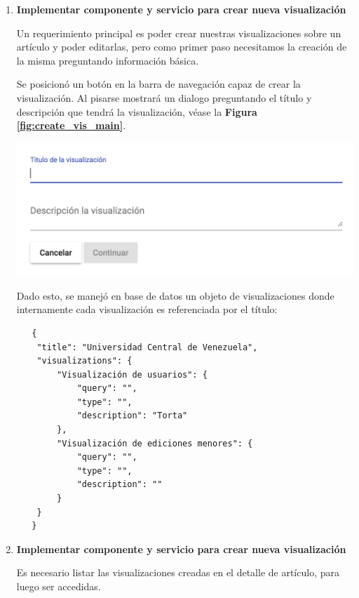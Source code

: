\begin{enumerate}
  \smallbreak
  \item\textbf{Implementar componente y servicio para crear nueva visualización}
  \smallbreak

  Un requerimiento principal es poder crear nuestras visualizaciones sobre un artículo y poder editarlas, pero como primer paso necesitamos la creación de la misma preguntando información básica.
  
 
  Se posicionó un botón en la barra de navegación capaz de crear la visualización. Al pisarse mostrará un dialogo preguntando el título y descripción que tendrá la visualización, véase la \textbf{Figura \ref{fig:create_vis_main}}.

  \begin{center}
      \bigbreak
      \includegraphics[scale=0.55]{images/marco_aplicativo/create_vis_main.png}
      \label{fig:create_vis_main}
      \bigbreak
  \end{center}
  
  Dado esto, se manejó en base de datos un objeto de visualizaciones donde internamente cada visualización es referenciada por el título:

  \begin{verbatim}
   {
    "title": "Universidad Central de Venezuela",
    "visualizations": {
        "Visualización de usuarios": {
            "query": "",
            "type": "",
            "description": "Torta"
        },
        "Visualización de ediciones menores": {
            "query": "",
            "type": "",
            "description": ""
        }
    }
   }
  \end{verbatim}
  
  \smallbreak
  \item\textbf{Implementar componente y servicio para crear nueva visualización}
  \smallbreak

  Es necesario listar las visualizaciones creadas en el detalle de artículo, para luego ser accedidas.
 

\end{enumerate}
